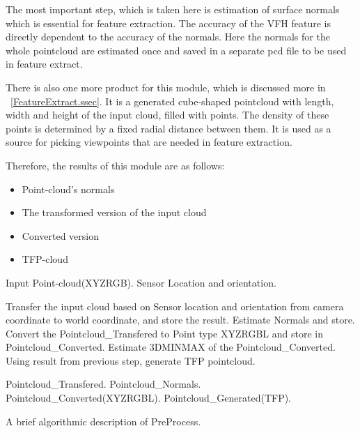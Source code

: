  The most important step, which is taken here is estimation of surface normals which is essential for feature extraction. 
 The accuracy of the VFH feature is directly dependent to the accuracy of the normals. 
 Here the normals for the whole pointcloud are estimated once and saved in a separate pcd file to be used in 
 feature extract. 
 
 There is also one more product for this module, which is discussed more in ~\ref{FeatureExtract.ssec}.
 It is a generated cube-shaped pointcloud with length, width and height of the input cloud, filled with points.
 The density of these points is determined by a fixed radial distance between them.
 It is used as a source for picking viewpoints that are needed in feature extraction.
 
 Therefore, the results of this module are as follows:
 \begin{itemize}
  \item Point-cloud's normals
  \item The transformed version of the input cloud
  \item Converted version
  \item TFP-cloud
 \end{itemize}
 
\begin{algorithm}[t]
\begin{algorithmic}[1]
\REQUIRE Input Point-cloud(XYZRGB).
\REQUIRE Sensor Location and orientation.
\medskip

\STATE Transfer the input cloud based on Sensor location and orientation from camera coordinate to world coordinate, and store the 
result.
\STATE Estimate Normals and store.
\STATE Convert the Pointcloud\_Transfered to Point type XYZRGBL and store in Pointcloud\_Converted.
\STATE Estimate 3DMINMAX of the Pointcloud\_Converted.
\STATE Using result from previous step, generate TFP pointcloud.

\medskip
\ENSURE Pointcloud\_Transfered.
\ENSURE Pointcloud\_Normals.
\ENSURE Pointcloud\_Converted(XYZRGBL).
\ENSURE Pointcloud\_Generated(TFP).

\end{algorithmic}
\caption[PreProcess.]
{A brief algorithmic description of PreProcess.}
\label{Preprocess.algorithm}
\end{algorithm}



